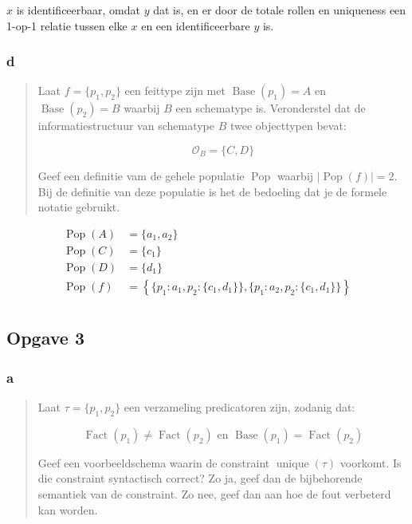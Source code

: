 \documentclass[10pt]{article}
\newcommand{\Base}{\ensuremath{\operatorname{Base}}}
\newcommand{\Fact}{\ensuremath{\operatorname{Fact}}}
\newcommand{\unique}{\ensuremath{\operatorname{unique}}}
\newcommand{\Pop}{\ensuremath{\operatorname{Pop}}}
\renewcommand{\O}{\ensuremath{\mathcal{O}}}
\begin{document}
$x$ is identificeerbaar, omdat $y$ dat is, en er door de totale rollen en uniqueness
een 1-op-1 relatie tussen elke $x$ en een identificeerbare $y$ is.

\subsubsection{d}

\begin{quote}

  Laat $f = \{p_1,p_2\}$ een feittype zijn met $\Base(p_1) = A$ en $\Base(p_2)
  = B$ waarbij $B$ een schematype is. Veronderstel dat de informatiestructuur
  van schematype $B$ twee objecttypen bevat:   

  \[ \O_B = \{ C, D \} \]
  
  Geef een definitie vam de gehele populatie $\Pop$ waarbij $|\Pop(f)| = 2$.
  Bij de definitie van deze populatie is het de bedoeling dat je de formele
  notatie gebruikt. \cite{tentamen2011}

\end{quote}

\begin{align*}
  \Pop(A) & = \{ a_1, a_2 \} \\
  \Pop(C) & = \{ c_1 \}      \\
  \Pop(D) & = \{ d_1 \}                                                                         \\
  \Pop(f) & = \left\{ \{ p_1: a_1, p_2:\{c_1, d_1\}\}, \{ p_1: a_2, p_2:\{c_1, d_1\}\} \right\} \\
\end{align*}


\subsection{Opgave 3}

\subsubsection{a}

\begin{quote}

  Laat $\tau = \{p_1, p_2\}$ een verzameling predicatoren zijn, zodanig dat: 

  \[
    \Fact(p_1) \neq \Fact(p_2) \text{ en } \Base(p_1) = \Fact(p_2)
  \]

  Geef een voorbeeldschema waarin de constraint $\unique(\tau)$ voorkomt. Is
  die constraint syntactisch correct? Zo ja, geef dan de bijbehorende semantiek
  van de constraint. Zo nee, geef dan aan hoe de fout verbeterd kan worden.
  \cite{tentamen2011}

\end{quote}
\end{document}
